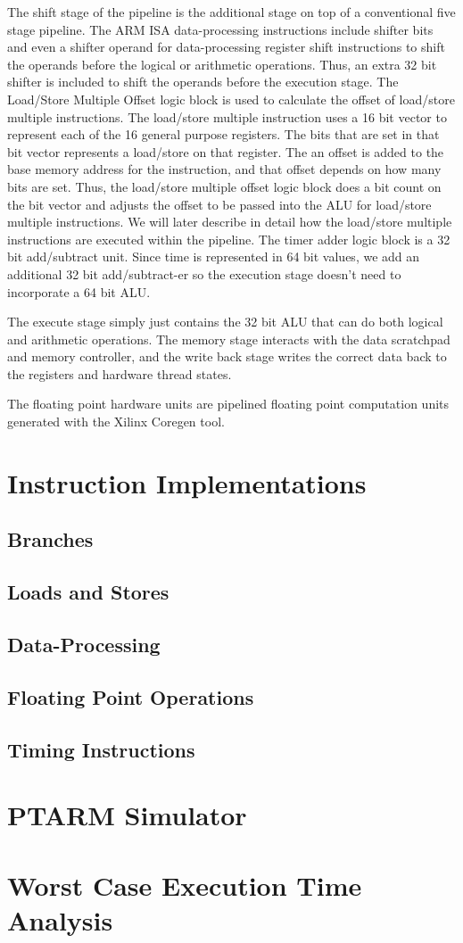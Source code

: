 The shift stage of the pipeline is the additional stage on top of a conventional five stage pipeline. 
The ARM ISA data-processing instructions include shifter bits and even a shifter operand for data-processing register shift instructions to shift the operands before the logical or arithmetic operations.
Thus, an extra 32 bit shifter is included to shift the operands before the execution stage. 
The Load/Store Multiple Offset logic block is used to calculate the offset of load/store multiple instructions.
The load/store multiple instruction uses a 16 bit vector to represent each of the 16 general purpose registers.
The bits that are set in that bit vector represents a load/store on that register.
The an offset is added to the base memory address for the instruction, and that offset depends on how many bits are set. 
Thus, the load/store multiple offset logic block does a bit count on the bit vector and adjusts the offset to be passed into the ALU for load/store multiple instructions.
We will later describe in detail how the load/store multiple instructions are executed within the pipeline.
The timer adder logic block is a 32 bit add/subtract unit. 
Since time is represented in 64 bit values, we add an additional 32 bit add/subtract-er so the execution stage doesn't need to incorporate a 64 bit ALU.

The execute stage simply just contains the 32 bit ALU that can do both logical and arithmetic operations. 
The memory stage interacts with the data scratchpad and memory controller, and the write back stage writes the correct data back to the registers and hardware thread states.

The floating point hardware units are pipelined floating point computation units generated with the Xilinx Coregen tool. 
 
\section{Instruction Implementations}
\subsection{Branches}
\subsection{Loads and Stores}
\subsection{Data-Processing}
\subsection{Floating Point Operations}
\subsection{Timing Instructions}

\section{PTARM Simulator}
\label{sec:ptarm_sim}

\section{Worst Case Execution Time Analysis}
\label{sec:wcet}




